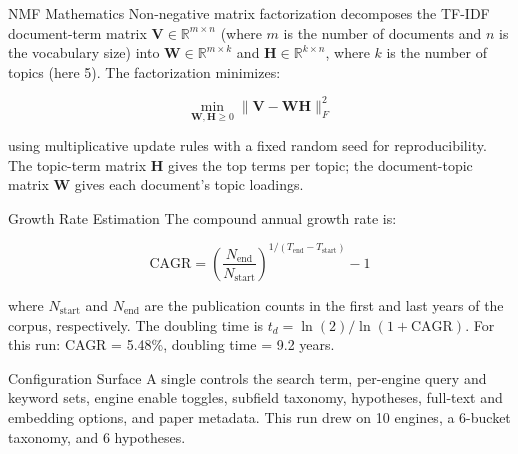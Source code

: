 \documentclass[
  ignorenonframetext,
]{beamer}
\begin{document}
\begin{frame}[allowframebreaks]{NMF Mathematics}
\protect{}\label{nmf-mathematics}
Non-negative matrix factorization decomposes the TF-IDF document-term
matrix \(\mathbf{V} \in \mathbb{R}^{m \times n}\) (where \(m\) is the
number of documents and \(n\) is the vocabulary size) into
\(\mathbf{W} \in \mathbb{R}^{m \times k}\) and
\(\mathbf{H} \in \mathbb{R}^{k \times n}\), where \(k\) is the number of
topics (here 5). The factorization minimizes:

\[
\min_{\mathbf{W}, \mathbf{H} \geq 0} \|\mathbf{V} - \mathbf{W} \mathbf{H}\|_F^2
\]

using multiplicative update rules  with a fixed
random seed for reproducibility. The topic-term matrix \(\mathbf{H}\)
gives the top terms per topic; the document-topic matrix \(\mathbf{W}\)
gives each document's topic loadings.
\end{frame}

\begin{frame}[allowframebreaks]{Growth Rate Estimation}
\protect{}\label{growth-rate-estimation}
The compound annual growth rate is:

\[
\text{CAGR} = \left(\frac{N_{\text{end}}}{N_{\text{start}}}\right)^{1/(T_{\text{end}} - T_{\text{start}})} - 1
\]

where \(N_{\text{start}}\) and \(N_{\text{end}}\) are the publication
counts in the first and last years of the corpus, respectively. The
doubling time is \(t_d = \ln(2) / \ln(1 + \text{CAGR})\). For this run:
CAGR = 5.48\%, doubling time = 9.2 years.
\end{frame}

\begin{frame}{Configuration Surface}
\protect{}\label{configuration-surface}
A single  controls the search term,
per-engine query and keyword sets, engine enable toggles, subfield
taxonomy, hypotheses, full-text and embedding options, and paper
metadata. This run drew on 10 engines, a 6-bucket taxonomy, and 6
hypotheses.
\end{frame}
\end{document}
